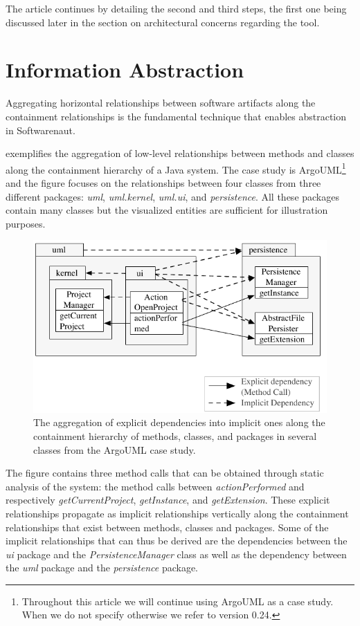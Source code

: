 \documentclass[preprint,12pt]{elsarticle}
\newcommand{\cd}[1]{{\em{#1}}}
\newcommand\on[1]{\nbc{ON}{#1}{red}} %
\begin{document}
The article continues by detailing the second and third steps, the first one being discussed later in the section on architectural concerns regarding the tool.

\section {Information Abstraction} \label{sec:org}

Aggregating horizontal relationships between software artifacts along the containment relationships is the fundamental technique that enables abstraction in Softwarenaut. 

 exemplifies the aggregation of low-level relationships between methods and classes along the containment hierarchy of a Java system. The case study is ArgoUML\footnote{Throughout this article we will continue using ArgoUML as a case study. When we do not specify otherwise we refer to version 0.24.} and the figure focuses on the relationships between four classes from three different packages: \cd{uml}, \cd{uml.kernel}, \cd{uml.ui}, and \cd{persistence}. All these packages contain many classes but the visualized entities are sufficient for illustration purposes. 

\begin{figure}[ht]
\begin{center}
\includegraphics[width=0.75\linewidth]{DependencyAggregation}
\caption{The aggregation of explicit dependencies into implicit ones along the containment hierarchy of methods, classes, and packages in several classes from the ArgoUML case study.}
\end{center}
\end{figure}
 
The figure contains three method calls that can be obtained through static analysis of the system: the method calls between \cd{actionPerformed} and respectively \cd{getCurrentProject}, \cd{getInstance}, and \cd{getExtension}. These explicit relationships propagate as implicit relationships vertically along the containment relationships that exist between methods, classes and packages. Some of the implicit relationships that can thus be derived are the dependencies between the \cd{ui} package and the \cd{PersistenceManager} class as well as the dependency between the \cd{uml} package and the \cd{persistence} package. 
\end{document}
